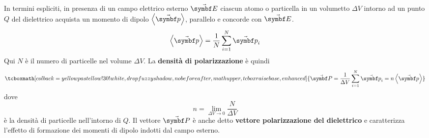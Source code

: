 In termini espliciti, in presenza di un campo elettrico esterno $\vba{E}$ ciascun atomo o particella in un volumetto $\Delta V$ intorno ad un punto $Q$ del dielettrico acquista un momento di dipolo $\left<\vba{p}\right>$, parallelo e concorde con $\vba{E}$.
\begin{equation*}
	\left<\vba{p}\right>=\frac{1}{N}\sum_{i=1}^N\vba{p}_i
\end{equation*}
Qui $N$ è il numero di particelle nel volume $\Delta V$. La \textbf{densità di polarizzazione} è quindi
\begin{equation}
	\tcboxmath[colback=yellowpastellow!30!white,drop fuzzy shadow, nobeforeafter, math upper, tcbox raise base, enhanced]{\vba{P}=\frac{1}{\Delta V}\sum_{i=1}^{N}\vba{p}_i=n\left<\vba{p}\right>}
\end{equation}
dove
\begin{equation*}
	n=\lim_{\Delta V\to 0}\frac{N}{\Delta V}
\end{equation*}
è la densità di particelle nell'intorno di $Q$. Il vettore $\vba{P}$ è anche detto \textbf{vettore polarizzazione del dielettrico} e caratterizza l'effetto di formazione dei momenti di dipolo indotti dal campo esterno.

